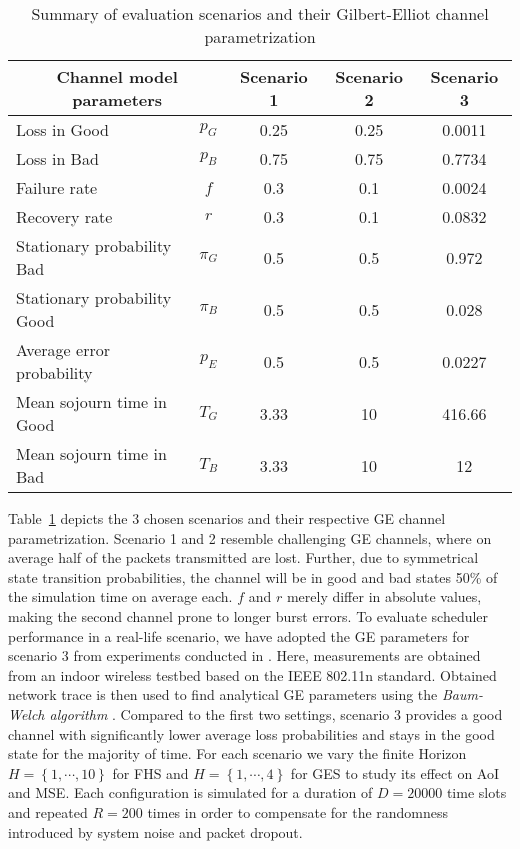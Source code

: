\begin{table}[htb]
  \begin{center}
  \begin{tabular}{|lc|c|c|c|} 
  \hline
  \multicolumn{2}{|c|}{\textbf{Channel model parameters}} & \textbf{Scenario 1} & \textbf{Scenario 2} & \textbf{Scenario 3} \\
  \hline \hline
  Loss in Good & $p_G$ & 0.25 & 0.25 & 0.0011 \\ 
  Loss in Bad & $p_B$ & 0.75 & 0.75 &  0.7734 \\ 
  Failure rate & $f$ & 0.3 & 0.1 & 0.0024 \\ 
  Recovery rate & $r$ & 0.3 & 0.1 & 0.0832 \\
  \hline
  Stationary probability Bad & $\pi_G$ & 0.5 & 0.5 & 0.972 \\
  Stationary probability Good & $\pi_B$ & 0.5 & 0.5 & 0.028 \\
  Average error probability & $p_E$ & 0.5 & 0.5 & 0.0227 \\
  Mean sojourn time in Good & $T_G$ & 3.33 & 10 & 416.66 \\
  Mean sojourn time in Bad & $T_B$ & 3.33 & 10 & 12 \\
  \hline
  \end{tabular}
  \end{center}
  \caption{Summary of evaluation scenarios and their Gilbert-Elliot channel parametrization}
  \label{tab:scenarios}
\end{table}

Table~\ref{tab:scenarios} depicts the 3 chosen scenarios and their respective GE
channel parametrization. Scenario 1 and 2 resemble challenging GE channels,
where on average half of the packets transmitted are lost. Further, due to
symmetrical state transition probabilities, the channel will be in good and bad
states 50\% of the simulation time on average each. $f$ and $r$ merely differ in
absolute values, making the second channel prone to longer burst errors. To
evaluate scheduler performance in a real-life scenario, we have adopted the GE
parameters for scenario 3 from experiments conducted in
\cite{frohn2011analyzing}. Here, measurements are obtained from an indoor
wireless testbed based on the IEEE 802.11n standard. Obtained network trace is
then used to find analytical GE parameters using the \textit{Baum-Welch
algorithm} \cite{baum1970maximization}. Compared to the first two settings,
scenario 3 provides a good channel with significantly lower average loss
probabilities and stays in the good state for the majority of time. For each
scenario we vary the finite Horizon $H=\left\{ 1, \cdots, 10\right\}$ for FHS
and $H=\left\{ 1, \cdots, 4\right\}$ for GES to study its effect on AoI and MSE.
Each configuration is simulated for a duration of $D=20000$ time slots and
repeated $R=200$ times in order to compensate for the randomness introduced by
system noise and packet dropout.

